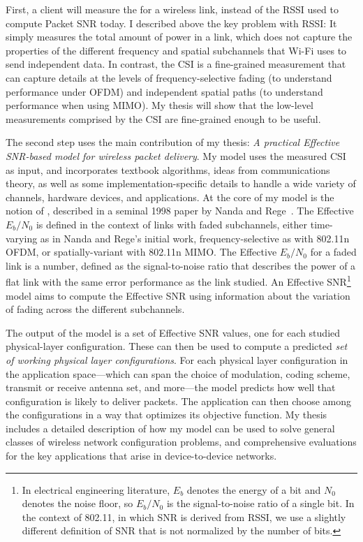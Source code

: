 First, a client will measure the  for a wireless link, instead of the RSSI used to compute Packet SNR today. I described above the key problem with RSSI: It simply measures the total amount of power in a link, which does not capture the properties of the different frequency and spatial subchannels that Wi-Fi uses to send independent data. In contrast, the CSI is a fine-grained measurement that can capture details at the levels of frequency-selective fading (to understand performance under OFDM) and independent spatial paths (to understand performance when using MIMO).
My thesis will show that the low-level measurements comprised by the CSI are fine-grained enough to be useful.

The second step uses the main contribution of my thesis: \emph{A practical Effective SNR-based model for wireless packet delivery}. My model uses the measured CSI as input, and incorporates textbook algorithms, ideas from communications theory, as well as some implementation-specific details to handle a wide variety of channels, hardware devices, and applications. At the core of my model is the notion of , described in a seminal 1998 paper by Nanda and Rege~\cite{Nanda_EffectiveSNR}. The Effective $E_b/N_0$ is defined in the context of links with faded subchannels, either time-varying as in Nanda and Rege's initial work, frequency-selective as with 802.11n OFDM, or spatially-variant with 802.11n MIMO. The Effective $E_b/N_0$ for a faded link is a number, defined as the signal-to-noise ratio that describes the power of a flat link with the same error performance as the link studied. An Effective SNR\footnote{In electrical engineering literature, $E_b$ denotes the energy of a bit and $N_0$ denotes the noise floor, so $E_b/N_0$ is the signal-to-noise ratio of a single bit. In the context of 802.11, in which SNR is derived from RSSI, we use a slightly different definition of SNR that is not normalized by the number of bits.} model aims to compute the Effective SNR using information about the variation of fading across the different subchannels.

The output of the model is a set of Effective SNR values, one for each studied physical-layer configuration. These can then be used to compute a predicted \emph{set of working physical layer configurations}. For each physical layer configuration in the application space---which can span the choice of modulation, coding scheme, transmit or receive antenna set, and more---the model predicts how well that configuration is likely to deliver packets. The application can then choose among the configurations in a way that optimizes its objective function. My thesis includes a detailed description of how my model can be used to solve general classes of wireless network configuration problems, and comprehensive evaluations for the key applications that arise in device-to-device networks.

